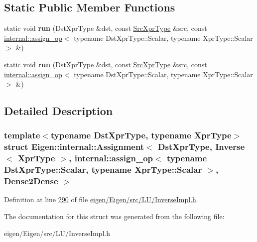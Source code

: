 \subsection*{Static Public Member Functions}
\begin{DoxyCompactItemize}
\item 
\mbox{\label{struct_eigen_1_1internal_1_1_assignment_3_01_dst_xpr_type_00_01_inverse_3_01_xpr_type_01_4_00_019b24182f99081c1fc09beae63c4c392d_a450acc4a5ca9172c882fd6d19a5ba35c}} 
static void {\bfseries run} (Dst\+Xpr\+Type \&dst, const \hyperlink{class_eigen_1_1_inverse}{Src\+Xpr\+Type} \&src, const \hyperlink{struct_eigen_1_1internal_1_1assign__op}{internal\+::assign\+\_\+op}$<$ typename Dst\+Xpr\+Type\+::\+Scalar, typename Xpr\+Type\+::\+Scalar $>$ \&)
\item 
\mbox{\label{struct_eigen_1_1internal_1_1_assignment_3_01_dst_xpr_type_00_01_inverse_3_01_xpr_type_01_4_00_019b24182f99081c1fc09beae63c4c392d_a450acc4a5ca9172c882fd6d19a5ba35c}} 
static void {\bfseries run} (Dst\+Xpr\+Type \&dst, const \hyperlink{class_eigen_1_1_inverse}{Src\+Xpr\+Type} \&src, const \hyperlink{struct_eigen_1_1internal_1_1assign__op}{internal\+::assign\+\_\+op}$<$ typename Dst\+Xpr\+Type\+::\+Scalar, typename Xpr\+Type\+::\+Scalar $>$ \&)
\end{DoxyCompactItemize}


\subsection{Detailed Description}
\subsubsection*{template$<$typename Dst\+Xpr\+Type, typename Xpr\+Type$>$\newline
struct Eigen\+::internal\+::\+Assignment$<$ Dst\+Xpr\+Type, Inverse$<$ Xpr\+Type $>$, internal\+::assign\+\_\+op$<$ typename Dst\+Xpr\+Type\+::\+Scalar, typename Xpr\+Type\+::\+Scalar $>$, Dense2\+Dense $>$}



Definition at line \hyperlink{eigen_2_eigen_2src_2_l_u_2_inverse_impl_8h_source_l00290}{290} of file \hyperlink{eigen_2_eigen_2src_2_l_u_2_inverse_impl_8h_source}{eigen/\+Eigen/src/\+L\+U/\+Inverse\+Impl.\+h}.



The documentation for this struct was generated from the following file\+:\begin{DoxyCompactItemize}
\item 
eigen/\+Eigen/src/\+L\+U/\+Inverse\+Impl.\+h\end{DoxyCompactItemize}

